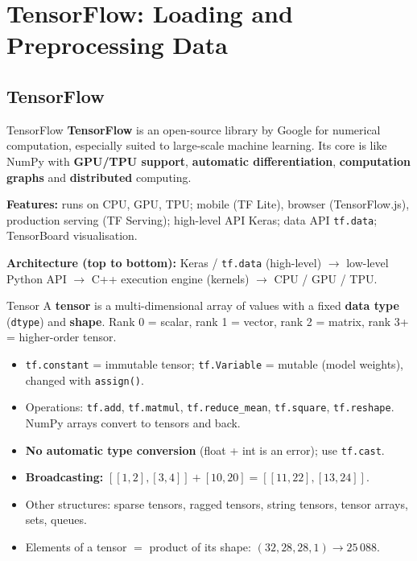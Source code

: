 \chapter{TensorFlow: Loading and Preprocessing Data}\label{n:tf}

\section{TensorFlow}
\begin{dfn}{TensorFlow}
\textbf{TensorFlow} is an open-source library by Google for numerical computation, especially suited to large-scale machine learning. Its core is like NumPy with \textbf{GPU/TPU support}, \textbf{automatic differentiation}, \textbf{computation graphs} and \textbf{distributed} computing.
\end{dfn}
\textbf{Features:} runs on CPU, GPU, TPU; mobile (TF Lite), browser (TensorFlow.js), production serving (TF Serving); high-level API Keras; data API \texttt{tf.data}; TensorBoard visualisation.

\textbf{Architecture (top to bottom):} Keras / \texttt{tf.data} (high-level) $\to$ low-level Python API $\to$ C++ execution engine (kernels) $\to$ CPU / GPU / TPU.

\begin{dfn}{Tensor}
A \textbf{tensor} is a multi-dimensional array of values with a fixed \textbf{data type} (\texttt{dtype}) and \textbf{shape}. Rank 0 = scalar, rank 1 = vector, rank 2 = matrix, rank 3+ = higher-order tensor.
\end{dfn}
\begin{itemize}
  \item \texttt{tf.constant} = immutable tensor; \texttt{tf.Variable} = mutable (model weights), changed with \texttt{assign()}.
  \item Operations: \texttt{tf.add}, \texttt{tf.matmul}, \texttt{tf.reduce\_mean}, \texttt{tf.square}, \texttt{tf.reshape}. NumPy arrays convert to tensors and back.
  \item \textbf{No automatic type conversion} (float + int is an error); use \texttt{tf.cast}.
  \item \textbf{Broadcasting:} $[[1,2],[3,4]]+[10,20]=[[11,22],[13,24]]$.
  \item Other structures: sparse tensors, ragged tensors, string tensors, tensor arrays, sets, queues.
  \item Elements of a tensor $=$ product of its shape: $(32,28,28,1)\to25\,088$.
\end{itemize}

